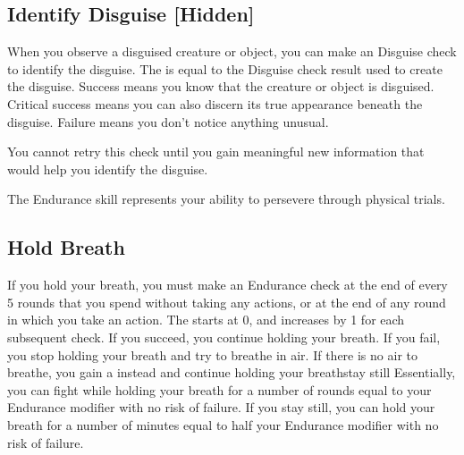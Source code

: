     \subsection{Identify Disguise [Hidden]}
        When you observe a disguised creature or object, you can make an Disguise check to identify the disguise.
        The  is equal to the Disguise check result used to create the disguise.
        Success means you know that the creature or object is disguised.
        Critical success means you can also discern its true appearance beneath the disguise.
        Failure means you don't notice anything unusual.

        You cannot retry this check until you gain meaningful new information that would help you identify the disguise.

\newpage
{}
    The Endurance skill represents your ability to persevere through physical trials.


    \subsection{Hold Breath}\label{Hold Breath}
        If you hold your breath, you must make an Endurance check at the end of every 5 rounds that you spend without taking any actions, or at the end of any round in which you take an action.
        The  starts at 0, and increases by 1 for each subsequent check.
        If you succeed, you continue holding your breath.
        If you fail, you stop holding your breath and try to breathe in air.
        If there is no air to breathe, you gain a  instead and continue holding your breathstay still
        Essentially, you can fight while holding your breath for a number of rounds equal to your Endurance modifier with no risk of failure.
        If you stay still, you can hold your breath for a number of minutes equal to half your Endurance modifier with no risk of failure.

